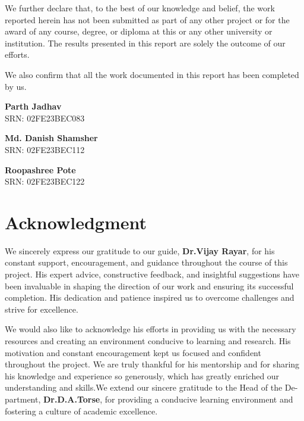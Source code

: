 \documentclass[12pt,a4paper,oneside]{report}
\begin{document}
\vspace{0.4cm}

We further declare that, to the best of our knowledge and belief, the work reported herein has not been submitted as part of any other project or for the award of any course, degree, or diploma at this or any other university or institution. The results presented in this report are solely the outcome of our efforts.

\vspace{0.4cm}

We also confirm that all the work documented in this report has been completed by us.

\vspace{1.2cm}

\hfill
\begin{minipage}{0.38\textwidth}
\raggedright

\textbf{Parth Jadhav}\\
SRN: 02FE23BEC083

\textbf{Md. Danish Shamsher}\\
SRN: 02FE23BEC112

\textbf{Roopashree Pote}\\
SRN: 02FE23BEC122

\end{minipage}





\newpage

\large\section*{Acknowledgment}



We sincerely express our gratitude to our guide, \textbf{Dr.Vijay Rayar}, for his constant support, encouragement, and guidance throughout the course of this project. His expert advice, constructive feedback, and insightful suggestions have been invaluable in shaping the direction of our work and ensuring its successful completion. His dedication and patience inspired us to overcome challenges and strive for excellence.

We would also like to acknowledge his efforts in providing us with the necessary resources and creating an environment conducive to learning and research. His motivation and constant encouragement kept us focused and confident throughout the project. We are truly thankful for his mentorship and for sharing his knowledge and experience so generously, which has greatly enriched our understanding and skills.We extend our sincere gratitude to the Head of the De-
partment,\textbf{ Dr.D.A.Torse}, for providing a conducive learning environment and fostering a culture of academic excellence.
\end{document}
